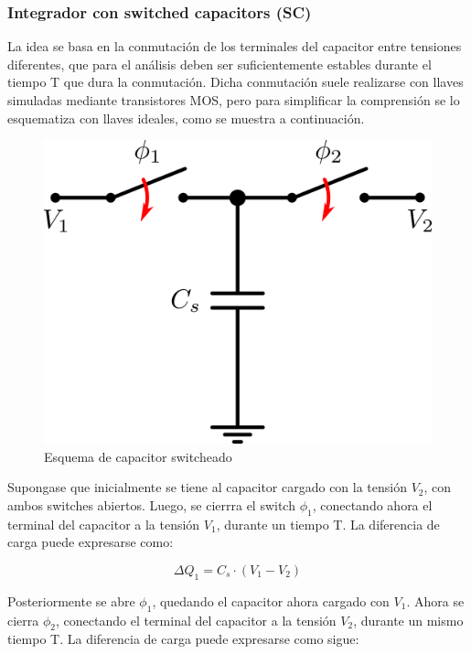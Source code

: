 \documentclass[assd_tp3_main.tex]{subfiles}
\begin{document}
\subsubsection{Integrador con switched capacitors (SC)}

La idea se basa en la conmutación de los terminales del capacitor entre tensiones diferentes, que para el análisis deben ser suficientemente estables durante el tiempo T que dura la conmutación. Dicha conmutación suele realizarse con llaves simuladas mediante transistores MOS, pero para simplificar la comprensión se lo esquematiza con llaves ideales, como se muestra a continuación.

\begin{figure}[!ht]
\begin{centering}
\includegraphics[scale=0.5]{images/ej5/SCBasico.png}
\par\end{centering}
\caption{Esquema de capacitor switcheado}
\end{figure}

Supongase que inicialmente se tiene al capacitor cargado con la tensión $V_2$, con ambos switches abiertos. Luego, se cierrra el switch $\phi_1$, conectando ahora el terminal del capacitor a la tensión $V_1$, durante un tiempo T. La diferencia de carga puede expresarse como:

\[
\Delta Q_1 = C_s \cdot (V_1 - V_2)
\]

Posteriormente se abre $\phi_1$, quedando el capacitor ahora cargado con $V_1$. Ahora se cierra $\phi_2$, conectando el terminal del capacitor a la tensión $V_2$, durante un mismo tiempo T. La diferencia de carga puede expresarse como sigue:
\end{document}
